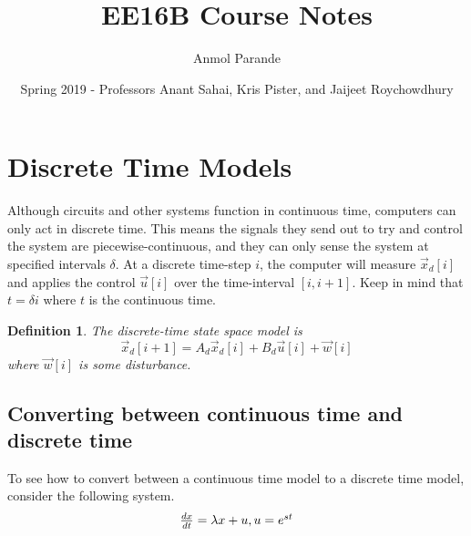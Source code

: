 \documentclass{article}
\newtheorem{definition}{Definition}
\begin{document}
\title{EE16B Course Notes}
\author{Anmol Parande}
\date{Spring 2019 - Professors Anant Sahai, Kris Pister, and Jaijeet Roychowdhury}
\maketitle
\section{Discrete Time Models}
Although circuits and other systems function in continuous time, computers can only act in discrete time.
This means the signals they send out to try and control the system are piecewise-continuous, and they can only sense the system at specified intervals $\delta$.
At a discrete time-step $i$, the computer will measure $\vec{x}_d[i]$ and applies the control $\vec{u}[i]$ over the time-interval $[i, i+1]$.
Keep in mind that $t=\delta i$ where $t$ is the continuous time.

\begin{definition}
    The discrete-time state space model is $$\vec{x}_d[i+1]=A_d\vec{x}_d[i]+B_d\vec{u}[i]+\vec{w}[i]$$ where $\vec{w}[i]$ is some disturbance.
\end{definition}

\subsection{Converting between continuous time and discrete time}
To see how to convert between a continuous time model to a discrete time model, consider the following system.
\[
    \begin{array}{c}
        \frac{dx}{dt}=\lambda x+u, u=e^{st}\\
    \end{array}\\
\]
\end{document}
